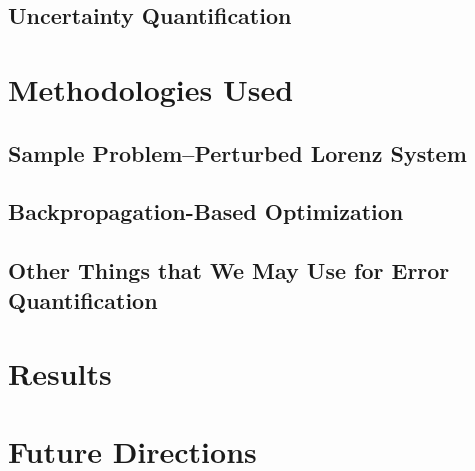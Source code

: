 \documentclass[12pt]{article}
\begin{document}
\subsection{Uncertainty Quantification}


















\section{Methodologies Used}

\subsection{Sample Problem\---Perturbed Lorenz System}

\subsection{Backpropagation-Based Optimization}

\subsection{Other Things that We May Use for Error Quantification}



\section{Results}


\section{Future Directions}



\nocite{*}

\end{document}
